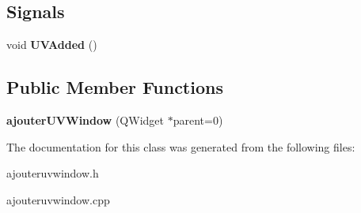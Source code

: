 \subsection*{Signals}
\begin{DoxyCompactItemize}
\item 
\hypertarget{classajouter_u_v_window_a90c73636da04e8b86282720edba7be74}{void {\bfseries U\+V\+Added} ()}\label{classajouter_u_v_window_a90c73636da04e8b86282720edba7be74}

\end{DoxyCompactItemize}
\subsection*{Public Member Functions}
\begin{DoxyCompactItemize}
\item 
\hypertarget{classajouter_u_v_window_adb410d8cb02f2759f64aeebe8eae337e}{{\bfseries ajouter\+U\+V\+Window} (Q\+Widget $\ast$parent=0)}\label{classajouter_u_v_window_adb410d8cb02f2759f64aeebe8eae337e}

\end{DoxyCompactItemize}


The documentation for this class was generated from the following files\+:\begin{DoxyCompactItemize}
\item 
ajouteruvwindow.\+h\item 
ajouteruvwindow.\+cpp\end{DoxyCompactItemize}
